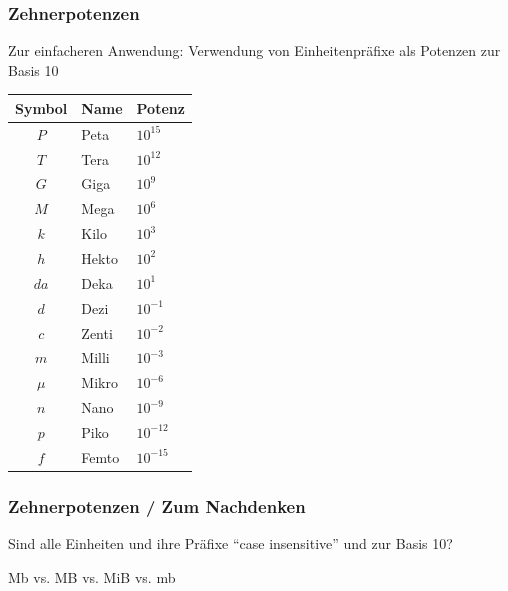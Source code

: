 \begin{frame}
  \frametitle{Zehnerpotenzen}

  Zur einfacheren Anwendung: Verwendung von Einheitenpräfixe als Potenzen zur Basis 10

  \begin{center}
    \footnotesize
    \begin{tabular}{|c|l|l|}\hline
      \textbf{Symbol} & \textbf{Name} & \textbf{Potenz} \\ \hline \hline
      $P$   & Peta  & $10^{15}$  \\ \hline
      $T$   & Tera  & $10^{12}$  \\ \hline
      $G$   & Giga  & $10^{9}$  \\ \hline
      $M$   & Mega  & $10^{6}$  \\ \hline
      $k$   & Kilo  & $10^{3}$  \\ \hline
      $h$   & Hekto & $10^{2}$  \\ \hline
      $da$  & Deka  & $10^{1}$  \\ \hline
      $d$   & Dezi  & $10^{-1}$ \\ \hline
      $c$   & Zenti & $10^{-2}$ \\ \hline
      $m$   & Milli & $10^{-3}$ \\ \hline
      $\mu$ & Mikro & $10^{-6}$ \\ \hline
      $n$   & Nano  & $10^{-9}$ \\ \hline
      $p$   & Piko  & $10^{-12}$ \\ \hline
      $f$   & Femto & $10^{-15}$ \\ \hline
    \end{tabular}
  \end{center}

\end{frame}

\begin{frame}
  \frametitle{Zehnerpotenzen / Zum Nachdenken}

  Sind alle Einheiten und ihre Präfixe ``case insensitive'' und zur Basis 10?

  \begin{block}{\begin{center}\Large Mb vs. MB vs. MiB vs. mb\end{center}}
  \end{block}

  \vspace{2em}



\end{frame}

